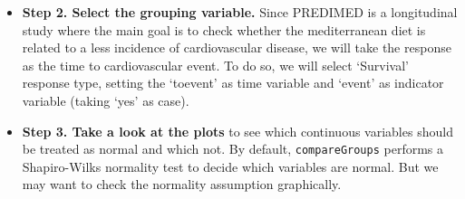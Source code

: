 \documentclass[11pt]{article}
\begin{document}
\begin{itemize}
\newpage
\item {\bf Step 2. Select the grouping variable.}
Since PREDIMED is a longitudinal study where the main goal is to check whether the mediterranean diet is related to a less incidence of cardiovascular disease, we will take the response as the time to cardiovascular event. To do so, we will select `Survival' response type, setting the `toevent' as time variable and `event' as indicator variable (taking `yes' as case).
\begin{center}
\end{center}

\vspace{0.5cm}
\item {\bf Step 3. Take a look at the plots} to see which continuous variables should be treated as normal and which not. By default, {\tt compareGroups} performs a Shapiro-Wilks normality test to decide which variables are normal. But we may want to check the normality assumption graphically.
\begin{center}
\end{center}


\end{itemize}
\end{document}

